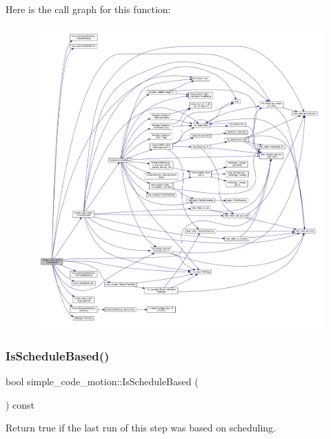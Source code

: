 Here is the call graph for this function\+:
\nopagebreak
\begin{figure}[H]
\begin{center}
\leavevmode
\includegraphics[width=350pt]{d5/d58/classsimple__code__motion_ada1641b8154a93dd9ea23bb778b8e059_cgraph}
\end{center}
\end{figure}
\mbox{\label{classsimple__code__motion_a4bc8cf1a2064701a32e036c9495477f7}} 
\subsubsection{\texorpdfstring{Is\+Schedule\+Based()}{IsScheduleBased()}}
{\footnotesize\ttfamily bool simple\+\_\+code\+\_\+motion\+::\+Is\+Schedule\+Based (\begin{DoxyParamCaption}{ }\end{DoxyParamCaption}) const}



Return true if the last run of this step was based on scheduling. 



